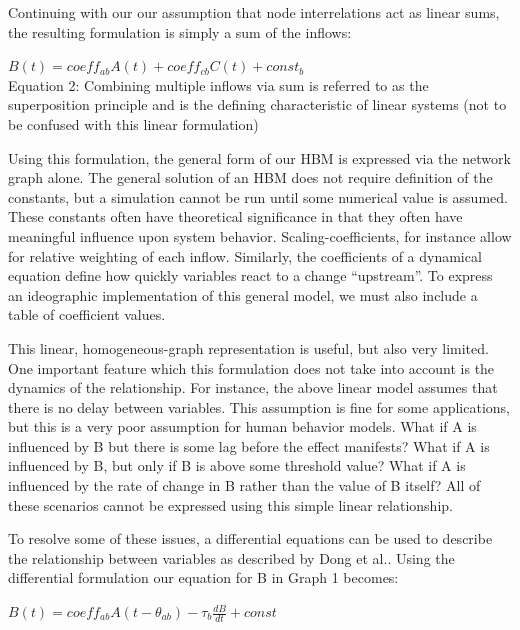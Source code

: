 \documentclass[runningheads,a4paper]{llncs}
\begin{document}
Continuing with our our assumption that node interrelations act as linear sums, the resulting formulation is simply a sum of the inflows:

\begin{centering}
$B(t) = coeff_{ab}A(t) + coeff_{cb}C(t) + const_b$\\
\small{Equation 2: Combining multiple inflows via sum is referred to as the superposition principle and is the defining characteristic of linear systems (not to be confused with this linear formulation)}
\end{centering}

Using this formulation, the general form of our HBM is expressed via the network graph alone.
The general solution of an HBM does not require definition of the constants, but a simulation cannot be run until some numerical value is assumed. 
These constants often have theoretical significance in that they often have meaningful influence upon system behavior. 
Scaling-coefficients, for instance allow for relative weighting of each inflow. 
Similarly, the coefficients of a dynamical equation define how quickly variables react to a change ``upstream''.
To express an ideographic implementation of this general model, we must also include a table of coefficient values. 

This linear, homogeneous-graph representation is useful, but also very limited.
One important feature which this formulation does not take into account is the dynamics of the relationship.
For instance, the above linear model assumes that there is no delay between variables.
This assumption is fine for some applications, but this is a very poor assumption for human behavior models. 
What if A is influenced by B but there is some lag before the effect manifests?
What if A is influenced by B, but only if B is above some threshold value? 
What if A is influenced by the rate of change in B rather than the value of B itself? 
All of these scenarios cannot be expressed using this simple linear relationship. 

To resolve some of these issues, a differential equations can be used to describe the relationship between variables as described by Dong et al.\cite{dong2012dynamical}. 
Using the differential formulation our equation for B in Graph 1 becomes:

\begin{centering}
$B(t) = coeff_{ab}A(t-\theta_{ab}) - \tau_{b}\frac{dB}{dt} + const$\\
\end{centering}
\end{document}
